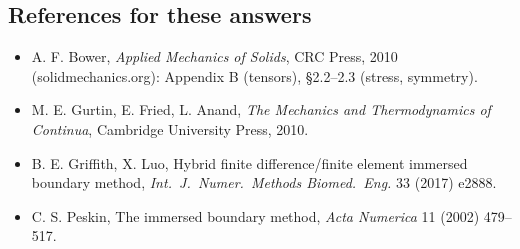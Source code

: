 \documentclass[12pt]{article}
\begin{document}
\subsection*{References for these answers}
\begin{itemize}
    \item A. F. Bower, \emph{Applied Mechanics of Solids}, CRC Press, 2010 (solidmechanics.org): Appendix B (tensors), \S2.2--2.3 (stress, symmetry).
    \item M. E. Gurtin, E. Fried, L. Anand, \emph{The Mechanics and Thermodynamics of Continua}, Cambridge University Press, 2010.
    \item B. E. Griffith, X. Luo, Hybrid finite difference/finite element immersed boundary method, \emph{Int.\ J.\ Numer.\ Methods Biomed.\ Eng.} 33 (2017) e2888.
    \item C. S. Peskin, The immersed boundary method, \emph{Acta Numerica} 11 (2002) 479--517.
\end{itemize}
\end{document}
